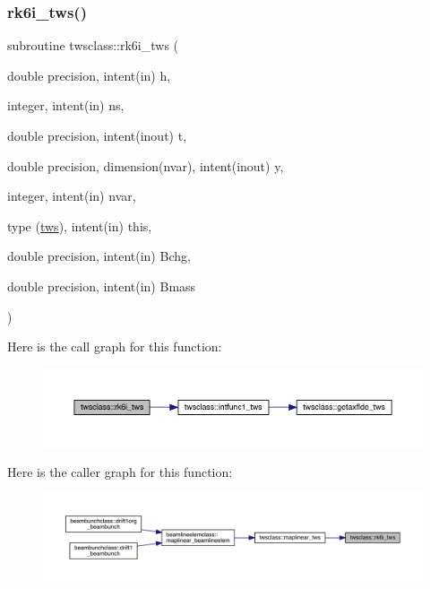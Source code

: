 \subsubsection{\texorpdfstring{rk6i\_tws()}{rk6i\_tws()}}
{\footnotesize\ttfamily subroutine twsclass\+::rk6i\+\_\+tws (\begin{DoxyParamCaption}\item[{double precision, intent(in)}]{h,  }\item[{integer, intent(in)}]{ns,  }\item[{double precision, intent(inout)}]{t,  }\item[{double precision, dimension(nvar), intent(inout)}]{y,  }\item[{integer, intent(in)}]{nvar,  }\item[{type (\mbox{\hyperlink{namespacetwsclass_structtwsclass_1_1tws}{tws}}), intent(in)}]{this,  }\item[{double precision, intent(in)}]{Bchg,  }\item[{double precision, intent(in)}]{Bmass }\end{DoxyParamCaption})}

Here is the call graph for this function\+:\nopagebreak
\begin{figure}[H]
\begin{center}
\leavevmode
\includegraphics[width=350pt]{namespacetwsclass_a2d527684d5c9fd42e3217ac03914bd90_cgraph}
\end{center}
\end{figure}
Here is the caller graph for this function\+:\nopagebreak
\begin{figure}[H]
\begin{center}
\leavevmode
\includegraphics[width=350pt]{namespacetwsclass_a2d527684d5c9fd42e3217ac03914bd90_icgraph}
\end{center}
\end{figure}
\mbox{\label{namespacetwsclass_a15770a288893203a1f18bde3f1ab190c}} 
